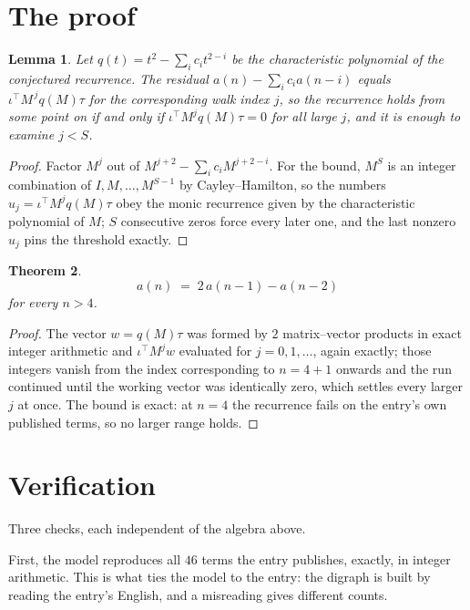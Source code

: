 \documentclass[11pt,a4paper]{article}
\theoremstyle{plain}
\newtheorem{theorem}{Theorem}
\newtheorem{lemma}[theorem]{Lemma}
\theoremstyle{definition}
\begin{document}
\section{The proof}

\begin{lemma}\label{lem:crit}
Let $q(t)=t^{2}-\sum_i c_it^{2-i}$ be the characteristic polynomial of the
conjectured recurrence. The residual $a(n)-\sum_ic_ia(n-i)$ equals
$\iota^{\!\top}M^{\,j}q(M)\tau$ for the corresponding walk index $j$, so the recurrence
holds from some point on if and only if $\iota^{\!\top}M^{j}q(M)\tau=0$ for all large $j$,
and it is enough to examine $j<S$.
\end{lemma}

\begin{proof}
Factor $M^{j}$ out of $M^{j+2}-\sum_ic_iM^{j+2-i}$. For the bound, $M^{S}$
is an integer combination of $I,M,\dots,M^{S-1}$ by Cayley--Hamilton, so the numbers
$u_j=\iota^{\!\top}M^{j}q(M)\tau$ obey the monic recurrence given by the characteristic
polynomial of $M$; $S$ consecutive zeros force every later one, and the last nonzero $u_j$
pins the threshold exactly.
\end{proof}

\begin{theorem}
\[
a(n)\;=\;2\,a(n-1) - a(n-2)
\]
for every $n>4$.
\end{theorem}

\begin{proof}
The vector $w=q(M)\tau$ was formed by $2$ matrix--vector products in exact integer
arithmetic and $\iota^{\!\top}M^{j}w$ evaluated for $j=0,1,\dots$, again exactly; those
integers vanish from the index corresponding to $n=4+1$ onwards and the run continued
until the working vector was identically zero, which settles every larger $j$ at once. The bound is exact: at $n=4$ the recurrence fails on the entry's own published terms, so no larger range holds.
\end{proof}

\section{Verification}

Three checks, each independent of the algebra above.

First, the model reproduces all $46$ terms the entry publishes, exactly, in integer
arithmetic. This is what ties the model to the entry: the digraph is built by reading the
entry's English, and a misreading gives different counts.
\end{document}
